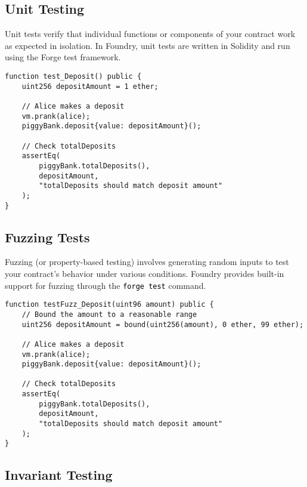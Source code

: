 \documentclass[12pt]{article}
\newcommand{\codegrey}[1]{%
  \texttt{\colorbox{black!4}{\textcolor{black}{#1}}}%
}
\begin{document}
\subsection*{Unit Testing}

Unit tests verify that individual functions or components of your contract work as expected in isolation. In Foundry, unit tests are written in Solidity and run using the Forge test framework.

\noindent \begin{minipage}{\textwidth}
\begin{lstlisting}[language=Solidity]
function test_Deposit() public {
    uint256 depositAmount = 1 ether;
    
    // Alice makes a deposit
    vm.prank(alice);
    piggyBank.deposit{value: depositAmount}();
    
    // Check totalDeposits
    assertEq(
        piggyBank.totalDeposits(),
        depositAmount,
        "totalDeposits should match deposit amount"
    );
}
\end{lstlisting}
\end{minipage}

\subsection*{Fuzzing Tests}

Fuzzing (or property-based testing) involves generating random inputs to test your contract's behavior under various conditions. Foundry provides built-in support for fuzzing through the \codegrey{forge test} command.

\noindent \begin{minipage}{\textwidth}
  \begin{lstlisting}[language=Solidity]
function testFuzz_Deposit(uint96 amount) public {
    // Bound the amount to a reasonable range
    uint256 depositAmount = bound(uint256(amount), 0 ether, 99 ether);
    
    // Alice makes a deposit
    vm.prank(alice);
    piggyBank.deposit{value: depositAmount}();
    
    // Check totalDeposits
    assertEq(
        piggyBank.totalDeposits(),
        depositAmount,
        "totalDeposits should match deposit amount"
    );
}
\end{lstlisting}
\end{minipage}

\subsection*{Invariant Testing}
\end{document}
